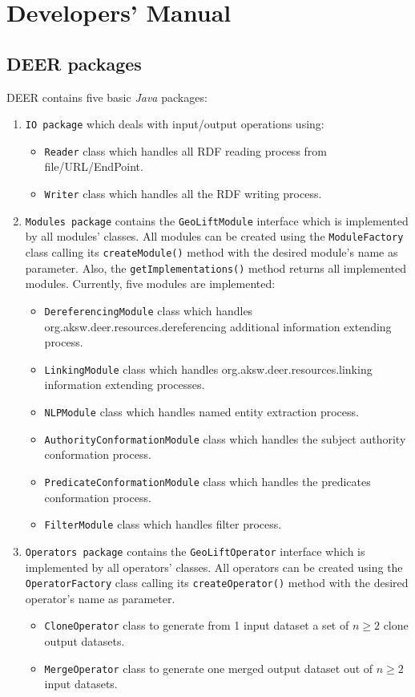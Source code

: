 \documentclass[a4paper,twoside,bibtotoc,abstracton,12pt,BCOR=15mm]{article}
\newcommand{\geolift}{\textsc{DEER}\xspace}
\begin{document}
\section{Developers' Manual}

\subsection{\geolift packages}
\geolift contains five basic \emph{Java} packages: 
\begin{enumerate}
 \item \texttt{IO package} which deals with input/output operations using:
   \begin{itemize}
    \item \texttt{Reader} class which handles all RDF reading process from file/URL/EndPoint. 
    \item \texttt{Writer} class which handles all the RDF writing process. 
  \end{itemize}

  \item\texttt{Modules package} contains the \texttt{GeoLiftModule} interface which is implemented by all modules' classes.
      All modules can be created using the \texttt{ModuleFactory} class calling its \texttt{createModule()} method with the desired module's name as parameter.
      Also, the \texttt{getImplementations()} method returns all implemented modules.
      Currently, five modules are implemented:
      \begin{itemize}
	\item \texttt{DereferencingModule} class which handles org.aksw.deer.resources.dereferencing  additional information extending process.
	\item \texttt{LinkingModule} class which handles org.aksw.deer.resources.linking information extending processes.
	\item \texttt{NLPModule} class which handles named entity extraction process.
	\item \texttt{AuthorityConformationModule} class which handles the subject authority conformation process.
	\item \texttt{PredicateConformationModule} class which handles the predicates conformation process.
	\item \texttt{FilterModule} class which handles filter process.
      \end{itemize}
  
   \item \texttt{Operators package} contains the \texttt{GeoLiftOperator} interface which is implemented by all operators' classes.
    All operators can be created using the \texttt{OperatorFactory} class calling its \texttt{createOperator()} method with the desired operator's name as parameter.
      \begin{itemize}
	\item \texttt{CloneOperator} class to generate from 1 input dataset a set of $n \geq 2$ clone output datasets.
	\item \texttt{MergeOperator} class to generate one merged output dataset out of $n \geq 2$ input datasets.
      \end{itemize}
 

\end{enumerate}
\end{document}
